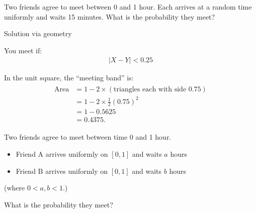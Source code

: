 \documentclass{report}
\begin{document}
{
  Two friends agree to meet between 0 and 1 hour.
Each arrives at a random time uniformly and waits 15 minutes.
What is the probability they meet?  
}
\begin{sol}
    Solution via geometry

You meet if:
\begin{align*}
    |X-Y|<0.25
\end{align*}

In the unit square, the “meeting band” is:
\begin{align*}
\begin{aligned}
\text{Area} 
&= 1 - 2 \times (\text{triangles each with side } 0.75) \\
&= 1 - 2 \times \frac{1}{2} (0.75)^2 \\
&= 1 - 0.5625 \\
&= 0.4375.
\end{aligned}
\end{align*}

\centering
{}


\end{sol}

{
    Two friends agree to meet between time 0 and 1 hour.
    \begin{itemize}
        \item Friend A arrives uniformly on $[0,1]$ and waits $a$ hours
        \item Friend B arrives uniformly on $[0,1]$ and waits $b$ hours
    \end{itemize}
    (where $0<a,b<1.$)

    What is the probability they meet?
}
\end{document}
